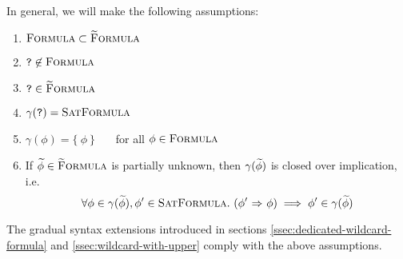 In general, we will make the following assumptions:
\begin{enumerate}
    \item $\textup{\textsc{Formula}} \subset \textup{\textsc{\ensuremath{\widetilde{\text{F}}}ormula}}$
    \item $\textup{\texttt{?}} \not \in \textup{\textsc{Formula}}$
    \item $\textup{\texttt{?}} \in \textup{\textsc{\ensuremath{\widetilde{\text{F}}}ormula}}$
    \item $\gamma(\textup{\texttt{?}}) = \textup{\textsc{SatFormula}}$
    \item $\gamma(\phi) = \{~\phi~\}$ ~~~for all $\phi \in \textup{\textsc{Formula}}$
    \item If $\widetilde{\phi} \in \textup{\textsc{\ensuremath{\widetilde{\text{F}}}ormula}}$ is partially unknown, then $\gamma(\widetilde{\phi})$ is closed over implication, i.e.
    \begin{displaymath}
    \forall \phi \in \gamma(\widetilde{\phi}), \phi' \in \textup{\textsc{SatFormula}}.~ ({\phi'} \,\,{\Rightarrow}\,\, {\phi}) \implies \phi' \in \gamma(\widetilde{\phi})
    \end{displaymath}
\end{enumerate}

The gradual syntax extensions introduced in sections \ref{ssec:dedicated-wildcard-formula} and \ref{ssec:wildcard-with-upper} comply with the above assumptions.